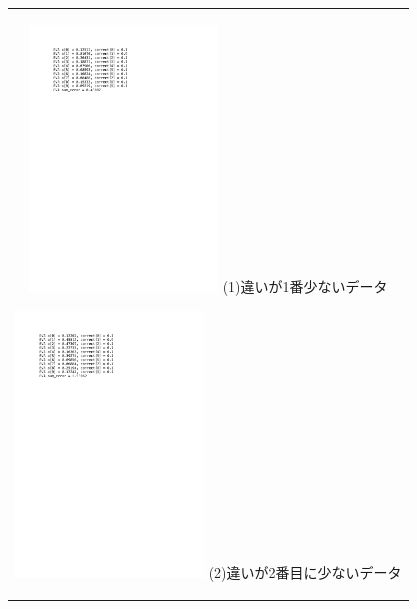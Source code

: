 \begin{figure}[htbp]
  \begin{center}
    \begin{tabular}{c}

      \begin{minipage}{0.33\hsize}
        \begin{center}
          \includegraphics[clip, width=5.0cm]{./lebel3-3figs/e1.pdf}
          \hspace{2.3cm} (1)違いが1番少ないデータ
        \end{center}
      \end{minipage}

      \begin{minipage}{0.33\hsize}
        \begin{center}
          \includegraphics[clip, width=5.0cm]{./lebel3-3figs/e2.pdf}
          \hspace{2.3cm} (2)違いが2番目に少ないデータ
        \end{center}
      \end{minipage}


\end{tabular}
\end{center}
\end{figure}
